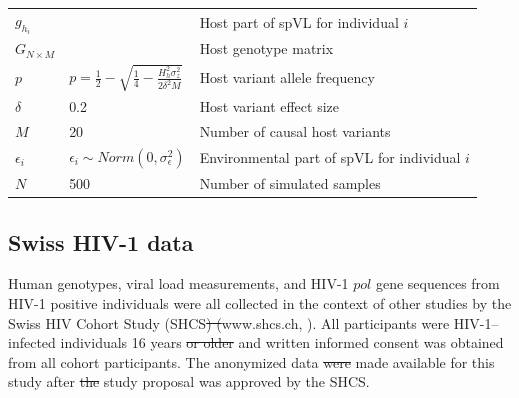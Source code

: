 \documentclass[12pt]{article} %
\providecommand{\DIFadd}[1]{{\protect\color{blue}\uwave{#1}}} %
\providecommand{\DIFdel}[1]{{\protect\color{red}\sout{#1}}}                      %
\providecommand{\DIFaddbegin}{} %
\providecommand{\DIFaddend}{} %
\providecommand{\DIFdelbegin}{} %
\providecommand{\DIFdelend}{} %
\newcommand{\DIFscaledelfig}{0.5}
\newlength{\DIFdelgraphicswidth} %
\newlength{\DIFdelgraphicsheight} %
\newcommand{\DIFaddincludegraphics}[2][]{{\color{blue}\fbox{\DIFOincludegraphics[#1]{#2}}}} %
\newcommand{\DIFdelincludegraphics}[2][]{%
\sbox{\DIFdelgraphicsbox}{\DIFOincludegraphics[#1]{#2}}%
\settoboxwidth{\DIFdelgraphicswidth}{\DIFdelgraphicsbox} %
\settoboxtotalheight{\DIFdelgraphicsheight}{\DIFdelgraphicsbox} %
\scalebox{\DIFscaledelfig}{%
\parbox[b]{\DIFdelgraphicswidth}{\usebox{\DIFdelgraphicsbox}\\[-\baselineskip] \rule{\DIFdelgraphicswidth}{0em}}\llap{\resizebox{\DIFdelgraphicswidth}{\DIFdelgraphicsheight}{%
\setlength{\unitlength}{\DIFdelgraphicswidth}%
\begin{picture}(1,1)%
\thicklines\linethickness{2pt} %
{\color[rgb]{1,0,0}\put(0,0){\framebox(1,1){}}}%
{\color[rgb]{1,0,0}\put(0,0){\line( 1,1){1}}}%
{\color[rgb]{1,0,0}\put(0,1){\line(1,-1){1}}}%
\end{picture}%
}\hspace*{3pt}}} %
} %
\DeclareRobustCommand{\DIFaddbegin}{\DIFOaddbegin \let\includegraphics\DIFaddincludegraphics} %
\DeclareRobustCommand{\DIFaddend}{\DIFOaddend \let\includegraphics\DIFOincludegraphics} %
\DeclareRobustCommand{\DIFdelbegin}{\DIFOdelbegin \let\includegraphics\DIFdelincludegraphics} %
\DeclareRobustCommand{\DIFdelend}{\DIFOaddend \let\includegraphics\DIFOincludegraphics} %
\begin{document}
\begin{doublespace}
\begin{table}[H]
\begin{tabularx}{\linewidth}{p{1.5cm}ll}
		$g_{h_i}$ & \makecell{$g_{h_i} = \delta \sum_{j = 1}^{j = M/2}{G_{ij}} - \\ \delta \sum_{j = M/2}^{j = M}{G_{ij}}$} & Host part of spVL for individual $i$ \\ 
		$G_{N \times M}$ & \makecell{$G_{ij} \sim Binom(2, p)\ \\ \forall i \in {1...N}, \forall j \in {1...M}$} & Host genotype matrix \\
		$p$ & $p = \frac{1}{2} - \sqrt{\frac{1}{4} - \frac{H_{h}^2\sigma^2_z}{2\delta^2M}}$ &  Host variant allele frequency \\ 
		$\delta$ & 0.2 & Host variant effect size \\ 
		$M$ & 20 & Number of causal host variants \\ 
		$\epsilon_i$ & $ \epsilon_i \sim Norm(0, \sigma^2_{\epsilon})$ & Environmental part of spVL for individual $i$ \\ 
		$N$ & 500 & Number of simulated samples \\ \bottomrule 
	\end{tabularx}
	\label{tab:sim-params}
\end{table}

\subsection*{Swiss HIV-1 data}

Human genotypes, viral load measurements, and HIV-1 $pol$ gene sequences from HIV-1 positive individuals were all collected in the context of other studies by the Swiss HIV Cohort Study (SHCS\DIFdelbegin \DIFdel{) (}\DIFdelend \DIFaddbegin \DIFadd{, }\DIFaddend www.shcs.ch, \citet{Schoeni-Affolter2010, Scherrer2021CohortSHCS}). All participants were HIV-1–infected individuals \DIFaddbegin \DIFadd{at least }\DIFaddend 16 years \DIFdelbegin \DIFdel{or older }\DIFdelend \DIFaddbegin \DIFadd{old }\DIFaddend and written informed consent was obtained from all cohort participants. The anonymized data \DIFdelbegin \DIFdel{were }\DIFdelend \DIFaddbegin \DIFadd{was }\DIFaddend made available for this study after \DIFdelbegin \DIFdel{the }\DIFdelend \DIFaddbegin \DIFadd{a }\DIFaddend study proposal was approved by the SHCS. 


\end{doublespace}
\end{document}
